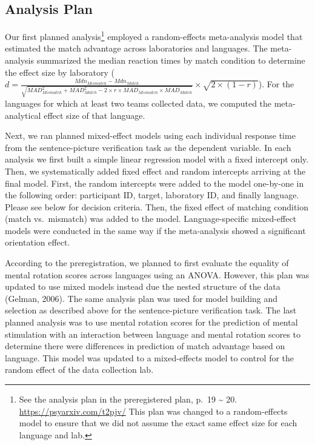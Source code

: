 \documentclass[
  man,floatsintext]{apa7}
\begin{document}
\hypertarget{analysis-plan}{%
\subsection{Analysis Plan}\label{analysis-plan}}

Our first planned analysis\footnote{See the analysis plan in the preregistered plan, p.~19 \textasciitilde{} 20. \url{https://psyarxiv.com/t2pjv/} This plan was changed to a random-effects model to ensure that we did not assume the exact same effect size for each language and lab.} employed a random-effects meta-analysis model that estimated the match advantage across laboratories and languages. The meta-analysis summarized the median reaction times by match condition to determine the effect size by laboratory (\(d = \frac{Mdn_{Mismatch} - Mdn_{Match}}{\sqrt{MAD_{Mismatch}^2 + MAD_{Match}^2-2\times r\times MAD_{Mismatch} \times MAD_{Match}}} \times \sqrt{2 \times (1-r)}\)). For the languages for which at least two teams collected data, we computed the meta-analytical effect size of that language.

Next, we ran planned mixed-effect models using each individual response time from the sentence-picture verification task as the dependent variable. In each analysis we first built a simple linear regression model with a fixed intercept only. Then, we systematically added fixed effect and random intercepts arriving at the final model. First, the random intercepts were added to the model one-by-one in the following order: participant ID, target, laboratory ID, and finally language. Please see below for decision criteria. Then, the fixed effect of matching condition (match vs.~mismatch) was added to the model. Language-specific mixed-effect models were conducted in the same way if the meta-analysis showed a significant orientation effect.

According to the preregistration, we planned to first evaluate the equality of mental rotation scores across languages using an ANOVA. However, this plan was updated to use mixed models instead due the nested structure of the data (Gelman, 2006). The same analysis plan was used for model building and selection as described above for the sentence-picture verification task. The last planned analysis was to use mental rotation scores for the prediction of mental stimulation with an interaction between language and mental rotation scores to determine there were differences in prediction of match advantage based on language. This model was updated to a mixed-effects model to control for the random effect of the data collection lab.
\end{document}
